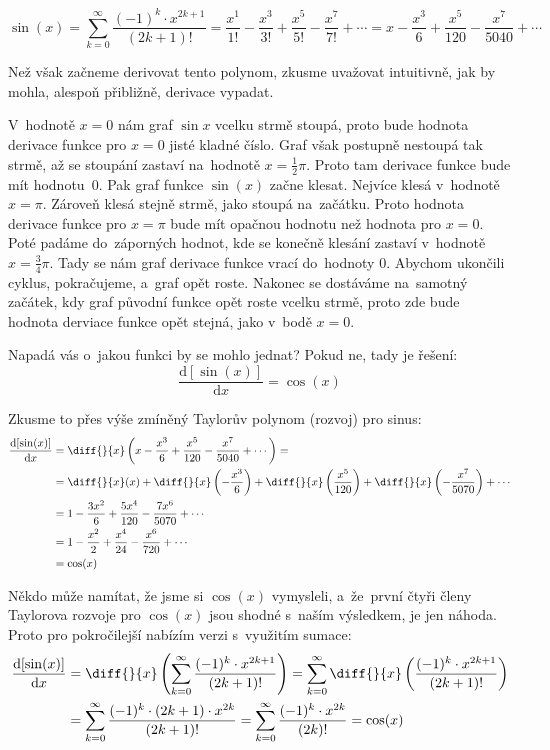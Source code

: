 \begin{equation*}
    \sin(x)
    = \sum_{k=0}^{\infty} \frac{(-1)^k \cdot x^{2k + 1}}{(2k + 1)!}
    = \frac{x^1}{1!} - \frac{x^3}{3!} + \frac{x^5}{5!} - \frac{x^7}{7!} + \cdots
    = x - \frac{x^3}{6} + \frac{x^5}{120} - \frac{x^7}{5040} + \cdots
\end{equation*}

Než však začneme derivovat tento polynom, zkusme uvažovat intuitivně, jak by mohla, alespoň přibližně, derivace vypadat.

V~hodnotě $x = 0$ nám graf $\sin x$ vcelku strmě stoupá, proto bude hodnota derivace funkce pro $x = 0$ jisté kladné číslo. Graf však postupně nestoupá tak strmě, až se stoupání zastaví na~hodnotě $x = \frac12 \pi$. Proto tam derivace funkce bude mít hodnotu~0. Pak graf funkce $\sin(x)$ začne klesat. Nejvíce klesá v~hodnotě $x = \pi$. Zároveň klesá stejně strmě, jako stoupá na~začátku. Proto hodnota derivace funkce pro $x = \pi$ bude mít opačnou hodnotu než hodnota pro $x = 0$. Poté padáme do~záporných hodnot, kde se konečně klesání zastaví v~hodnotě $x = \frac34 \pi$. Tady se nám graf derivace funkce vrací do~hodnoty 0. Abychom ukončili cyklus, pokračujeme, a~graf opět roste. Nakonec se dostáváme na~samotný začátek, kdy graf původní funkce opět roste vcelku strmě, proto zde bude hodnota derviace funkce opět stejná, jako v~bodě $x = 0$. 

Napadá vás o~jakou funkci by se mohlo jednat? Pokud ne, tady je řešení:
\begin{equation*}
    \frac{\text{d}[\sin(x)]}{\text{d}x} = \cos(x)
\end{equation*}

Zkusme to přes výše zmíněný Taylorův polynom (rozvoj) pro sinus:
\begin{align*}
    \frac{\text{d}[\sin(x)]}{\text{d}x}
    &= \diff{}{x} \left(x - \frac{x^3}{6} + \frac{x^5}{120} - \frac{x^7}{5040} + \cdots \right) = \\
    &= \diff{}{x} (x)
    + \diff{}{x} \left(-\frac{x^3}{6}\right)
    + \diff{}{x} \left(\frac{x^5}{120}\right)
    + \diff{}{x} \left(-\frac{x^7}{5070}\right)
    + \cdots \\
    &= 1 - \frac{3x^2}{6} + \frac{5x^4}{120} - \frac{7x^6}{5070} + \cdots \\
    &= 1 - \frac{x^2}{2} + \frac{x^4}{24} - \frac{x^6}{720} + \cdots \\
    &= \cos(x)
\end{align*}

Někdo může namítat, že jsme si $\cos(x)$ vymysleli, a~že~první čtyři členy Taylorova rozvoje pro $\cos(x)$ jsou shodné s~naším výsledkem, je jen náhoda. Proto pro pokročilejší nabízím verzi s~využitím sumace:
\begin{align*}
    \frac{\text{d}[\sin(x)]}{\text{d}x}
    &= \diff{}{x} \left( \sum_{k=0}^{\infty} \frac{(-1)^k \cdot x^{2k + 1}}{(2k + 1)!} \right)
    = \sum_{k=0}^{\infty} \diff{}{x} \left( \frac{(-1)^k \cdot x^{2k + 1}}{(2k + 1)!} \right) \\
    &= \sum_{k=0}^{\infty} \frac{(-1)^k \cdot (2k+1) \cdot  x^{2k}}{(2k+1)!}
    = \sum_{k=0}^{\infty} \frac{(-1)^k \cdot  x^{2k}}{(2k)!}
    = \cos(x)
\end{align*}

